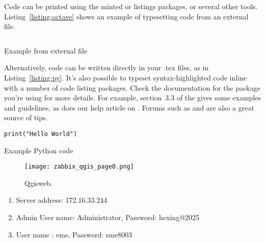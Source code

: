 Code can be printed using the minted or listings packages, or several other tools.
Listing~\ref{listing:octave} shows an example of typesetting code from an external file.

\begin{listing}
\inputminted{octave}{code/BitXorMatrix.m}
\caption{Example from external file}
\label{listing:octave}
\end{listing}

Alternatively, code can be written directly in your .tex files, as in Listing~\ref{listing:py}.
It's also possible to typeset syntax-highlighted code inline with a number of code listing packages.
Check the documentation for the package you're using for more details.
For example, section~3.3 of the  gives some examples and guidelines, as does our help article on . Forums such as  and  are also a great source of tips.

\begin{listing}
\begin{verbatim}
print("Hello World")
\end{verbatim}
\caption{Example Python code}
\label{listing:py}
\end{listing}


\begin{figure}[H]
    \begin{center}
        \texttt{[image: zabbix\_qgis\_page0.png]}\\
        \caption{ Qgisweb.}\label{zabbix_qgis_page0}
    \end{center}
\end{figure} 


\vspace{-.7cm}
\begin{enumerate}
    \item Server address: 172.16.33.244
    \item Admin User name: Administrator, Password: hexing@2025
    \item User name : ems, Password: sme8003
\end{enumerate}

\shortdashline